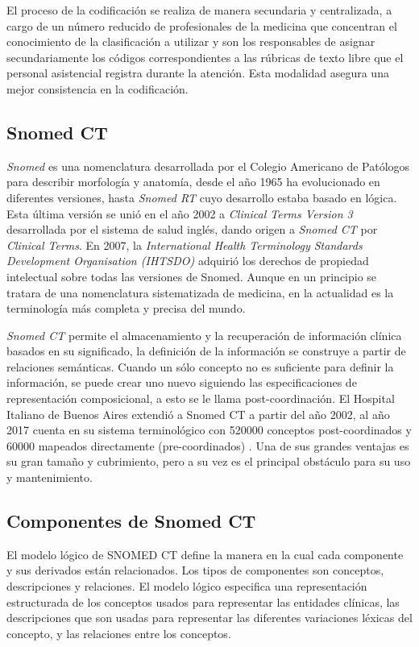 El proceso de la codificación se realiza de manera secundaria y centralizada, a cargo de un número reducido de profesionales de la medicina que concentran el conocimiento de la clasificación a utilizar y son los responsables de asignar secundariamente los códigos correspondientes a las rúbricas de texto libre que el personal asistencial registra durante la atención. Esta modalidad asegura una mejor consistencia en la codificación\cite{lopez2004codificacion,lopez2005desarrollo}.

\subsection{Snomed CT}
\textit{Snomed} es una nomenclatura desarrollada por el Colegio Americano de Patólogos para describir morfología y anatomía, desde el año 1965 ha evolucionado en diferentes versiones, hasta \textit{Snomed RT} cuyo desarrollo estaba basado en lógica. Esta última versión se unió en el año 2002 a \textit{Clinical Terms Version 3} desarrollada por el sistema de salud inglés, dando origen a \textit{Snomed CT} por \textit{Clinical Terms}. En 2007, la \textit{International Health Terminology Standards Development Organisation (IHTSDO)} adquirió los derechos de propiedad intelectual sobre todas las versiones de Snomed. Aunque en un principio se tratara de una nomenclatura sistematizada de medicina, en la actualidad es la terminología más completa y precisa del mundo. \cite{Bhattacharyya2016SNOMEDIHTSDO}

\textit{Snomed CT} permite el almacenamiento y la recuperación de información clínica basados en su significado, la definición de la información se construye a partir de relaciones semánticas\cite{Rector,Bhattacharyya2016,ihtsdo2016SG}. Cuando un sólo concepto no es suficiente para definir la información, se puede crear uno nuevo siguiendo las especificaciones de representación composicional, a esto se le llama post-coordinación. El Hospital Italiano de Buenos Aires extendió a Snomed CT a partir del año 2002, al año \num{2017} cuenta en su sistema terminológico con \num{520000} conceptos post-coordinados y \num{60000} mapeados directamente (pre-coordinados) . Una de sus grandes ventajas es su gran tamaño y cubrimiento, pero a su vez es el principal obstáculo para su uso y mantenimiento.

\subsection{Componentes de Snomed CT}
El modelo lógico de SNOMED CT define la manera en la cual cada componente  y sus derivados están relacionados. Los tipos de componentes son conceptos, descripciones y relaciones. El modelo lógico especifica una representación estructurada de los conceptos usados para representar las entidades clínicas, las descripciones  que son usadas para representar las diferentes variaciones léxicas del concepto, y las relaciones entre los conceptos.\cite{ihtsdo2016SG}

